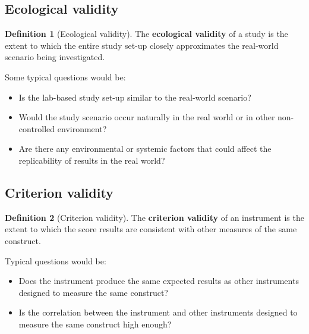 \documentclass[
  11pt,
]{book}
\providecommand{\tightlist}{%
  \setlength{\itemsep}{0pt}\setlength{\parskip}{0pt}}
\theoremstyle{definition}
\newtheorem{definition}{Definition}[chapter]
\theoremstyle{definition}
\theoremstyle{definition}
\theoremstyle{definition}
\theoremstyle{remark}
\begin{document}
\hypertarget{ecological-validity}{%
\subsection{Ecological validity}\label{ecological-validity}}

\begin{definition}[Ecological validity]
\protect\hypertarget{def:defecologicalvalidity}{}\label{def:defecologicalvalidity}The \textbf{ecological validity} of a study is the extent to which the entire study set-up closely approximates the real-world scenario being investigated.
\end{definition}

Some typical questions would be:

\begin{itemize}
\tightlist
\item
  Is the lab-based study set-up similar to the real-world scenario?
\item
  Would the study scenario occur naturally in the real world or in other non-controlled environment?
\item
  Are there any environmental or systemic factors that could affect the replicability of results in the real world?
\end{itemize}

\hypertarget{criterion-validity}{%
\subsection{Criterion validity}\label{criterion-validity}}

\begin{definition}[Criterion validity]
\protect\hypertarget{def:defcriterionvalidity}{}\label{def:defcriterionvalidity}The \textbf{criterion validity} of an instrument is the extent to which the score results are consistent with other measures of the same construct.
\end{definition}

Typical questions would be:

\begin{itemize}
\tightlist
\item
  Does the instrument produce the same expected results as other instruments designed to measure the same construct?
\item
  Is the correlation between the instrument and other instruments designed to measure the same construct high enough?
\end{itemize}
\end{document}
